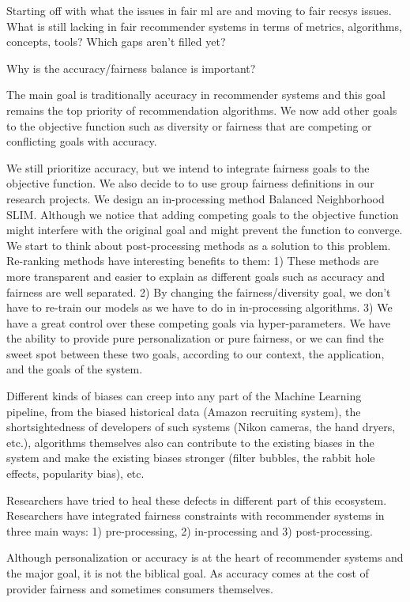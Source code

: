 Starting off with what the issues in fair ml are and moving to fair recsys issues.
What is still lacking in fair recommender systems in terms of metrics, algorithms, concepts, tools?
Which gaps aren't filled yet?

Why is the accuracy/fairness balance is important?

The main goal is traditionally accuracy in recommender systems and this goal remains the top priority of recommendation algorithms. We now add other goals to the objective function such as diversity or fairness that are competing or conflicting goals with accuracy.

We still prioritize accuracy, but we intend to integrate fairness goals to the objective function. We also decide to to use group fairness definitions in our research projects.
We design an in-processing method Balanced Neighborhood SLIM. Although we notice that adding competing goals to the objective function might interfere with the original goal and might prevent the function to converge. We start to think about post-processing methods as a solution to this problem. 
Re-ranking methods have interesting benefits to them: 1) These methods are more transparent and easier to explain as different goals such as accuracy and fairness are well separated. 2) By changing the fairness/diversity goal, we don't have to re-train our models as we have to do in in-processing algorithms. 3) We have a great control over these competing goals via hyper-parameters. We have the ability to provide pure personalization or pure fairness, or we can find the sweet spot between these two goals, according to our context, the application, and the goals of the system. 


Different kinds of biases can creep into any part of the Machine Learning pipeline, from the biased historical data (Amazon recruiting system), the shortsightedness of developers of such systems (Nikon cameras, the hand dryers, etc.), algorithms themselves also can contribute to the existing biases in the system and make the existing biases stronger (filter bubbles, the rabbit hole effects, popularity bias), etc.

Researchers have tried to heal these defects in different part of this ecosystem. Researchers have integrated fairness constraints with recommender systems in three main ways: 1) pre-processing, 2) in-processing and 3) post-processing.

Although personalization or accuracy is at the heart of recommender systems and the major goal, it is not the biblical goal. As accuracy comes at the cost of provider fairness and sometimes consumers themselves. 

